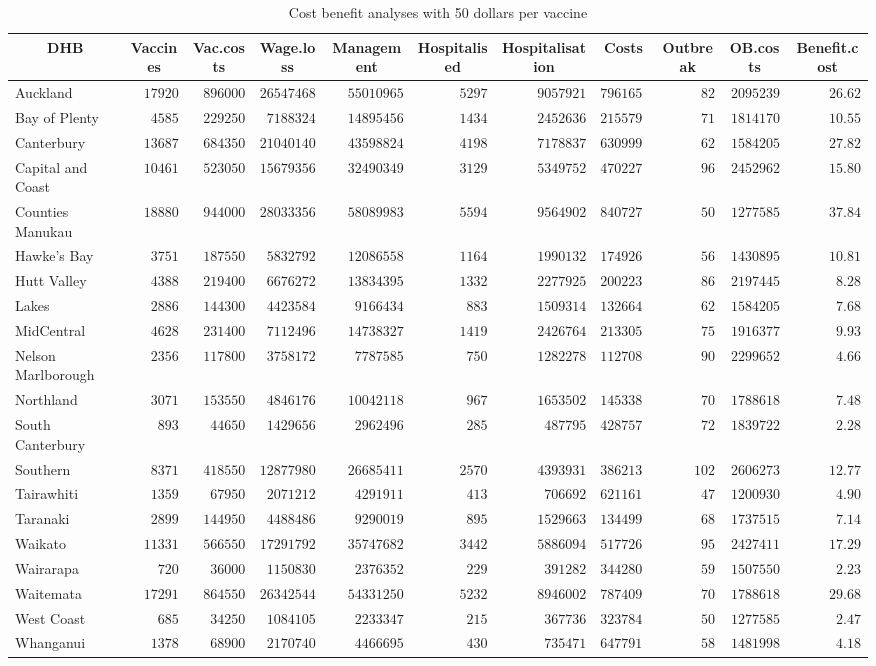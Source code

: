 \documentclass{article}
\begin{document}
\begin{table}\small
\caption{Cost benefit analyses with 50 dollars per vaccine}
\begin{center}
\begin{tabular}{lrrrrrrrrrr}
\hline\hline
\multicolumn{1}{c}{DHB}&\multicolumn{1}{c}{Vaccines}&\multicolumn{1}{c}{Vac.costs}&\multicolumn{1}{c}{Wage.loss}&\multicolumn{1}{c}{Management}&\multicolumn{1}{c}{Hospitalised}&\multicolumn{1}{c}{Hospitalisation}&\multicolumn{1}{c}{Costs}&\multicolumn{1}{c}{Outbreak}&\multicolumn{1}{c}{OB.costs}&\multicolumn{1}{c}{Benefit.cost}\tabularnewline
\hline
Auckland&$17920$&$896000$&$26547468$&$55010965$&$5297$&$9057921$&$79616516$&$ 82$&$2095239$&$26.62$\tabularnewline
Bay of Plenty&$ 4585$&$229250$&$ 7188324$&$14895456$&$1434$&$2452636$&$21557962$&$ 71$&$1814170$&$10.55$\tabularnewline
Canterbury&$13687$&$684350$&$21040140$&$43598824$&$4198$&$7178837$&$63099902$&$ 62$&$1584205$&$27.82$\tabularnewline
Capital and Coast&$10461$&$523050$&$15679356$&$32490349$&$3129$&$5349752$&$47022778$&$ 96$&$2452962$&$15.80$\tabularnewline
Counties Manukau&$18880$&$944000$&$28033356$&$58089983$&$5594$&$9564902$&$84072731$&$ 50$&$1277585$&$37.84$\tabularnewline
Hawke's Bay&$ 3751$&$187550$&$ 5832792$&$12086558$&$1164$&$1990132$&$17492688$&$ 56$&$1430895$&$10.81$\tabularnewline
Hutt Valley&$ 4388$&$219400$&$ 6676272$&$13834395$&$1332$&$2277925$&$20022305$&$ 86$&$2197445$&$ 8.28$\tabularnewline
Lakes&$ 2886$&$144300$&$ 4423584$&$ 9166434$&$ 883$&$1509314$&$13266438$&$ 62$&$1584205$&$ 7.68$\tabularnewline
MidCentral&$ 4628$&$231400$&$ 7112496$&$14738327$&$1419$&$2426764$&$21330552$&$ 75$&$1916377$&$ 9.93$\tabularnewline
Nelson Marlborough&$ 2356$&$117800$&$ 3758172$&$ 7787585$&$ 750$&$1282278$&$11270851$&$ 90$&$2299652$&$ 4.66$\tabularnewline
Northland&$ 3071$&$153550$&$ 4846176$&$10042118$&$ 967$&$1653502$&$14533802$&$ 70$&$1788618$&$ 7.48$\tabularnewline
South Canterbury&$  893$&$ 44650$&$ 1429656$&$ 2962496$&$ 285$&$ 487795$&$ 4287574$&$ 72$&$1839722$&$ 2.28$\tabularnewline
Southern&$ 8371$&$418550$&$12877980$&$26685411$&$2570$&$4393931$&$38621382$&$102$&$2606273$&$12.77$\tabularnewline
Tairawhiti&$ 1359$&$ 67950$&$ 2071212$&$ 4291911$&$ 413$&$ 706692$&$ 6211616$&$ 47$&$1200930$&$ 4.90$\tabularnewline
Taranaki&$ 2899$&$144950$&$ 4488486$&$ 9290019$&$ 895$&$1529663$&$13449923$&$ 68$&$1737515$&$ 7.14$\tabularnewline
Waikato&$11331$&$566550$&$17291792$&$35747682$&$3442$&$5886094$&$51772645$&$ 95$&$2427411$&$17.29$\tabularnewline
Wairarapa&$  720$&$ 36000$&$ 1150830$&$ 2376352$&$ 229$&$ 391282$&$ 3442806$&$ 59$&$1507550$&$ 2.23$\tabularnewline
Waitemata&$17291$&$864550$&$26342544$&$54331250$&$5232$&$8946002$&$78740929$&$ 70$&$1788618$&$29.68$\tabularnewline
West Coast&$  685$&$ 34250$&$ 1084105$&$ 2233347$&$ 215$&$ 367736$&$ 3237846$&$ 50$&$1277585$&$ 2.47$\tabularnewline
Whanganui&$ 1378$&$ 68900$&$ 2170740$&$ 4466695$&$ 430$&$ 735471$&$ 6477915$&$ 58$&$1481998$&$ 4.18$\tabularnewline
\hline
\end{tabular}\end{center}\label{table:cost50}
\end{table}
\end{document}
